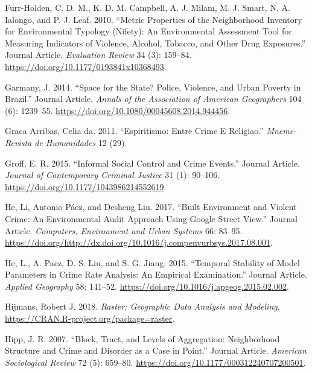 \documentclass[smallextended]{svjour3}       %
\begin{document}
\leavevmode\hypertarget{ref-Furr2010metric}{}%
Furr-Holden, C. D. M., K. D. M. Campbell, A. J. Milam, M. J. Smart, N.
A. Ialongo, and P. J. Leaf. 2010. ``Metric Properties of the
Neighborhood Inventory for Environmental Typology (Nifety): An
Environmental Assessment Tool for Measuring Indicators of Violence,
Alcohol, Tobacco, and Other Drug Exposures.'' Journal Article.
\emph{Evaluation Review} 34 (3): 159--84.
\url{https://doi.org/10.1177/0193841x10368493}.

\leavevmode\hypertarget{ref-Garmany2014space}{}%
Garmany, J. 2014. ``Space for the State? Police, Violence, and Urban
Poverty in Brazil.'' Journal Article. \emph{Annals of the Association of
American Geographers} 104 (6): 1239--55.
\url{https://doi.org/10.1080/00045608.2014.944456}.

\leavevmode\hypertarget{ref-daGraca2011espiritismo}{}%
Graca Arribas, Celia da. 2011. ``Espiritismo: Entre Crime E Religiao.''
\emph{Mneme-Revista de Humanidades} 12 (29).

\leavevmode\hypertarget{ref-Groff2015informal}{}%
Groff, E. R. 2015. ``Informal Social Control and Crime Events.'' Journal
Article. \emph{Journal of Contemporary Criminal Justice} 31 (1):
90--106. \url{https://doi.org/10.1177/1043986214552619}.

\leavevmode\hypertarget{ref-He2017built}{}%
He, Li, Antonio Páez, and Desheng Liu. 2017. ``Built Environment and
Violent Crime: An Environmental Audit Approach Using Google Street
View.'' Journal Article. \emph{Computers, Environment and Urban Systems}
66: 83--95.
\url{https://doi.org/http://dx.doi.org/10.1016/j.compenvurbsys.2017.08.001}.

\leavevmode\hypertarget{ref-He2015temporal}{}%
He, L., A. Paez, D. S. Liu, and S. G. Jiang. 2015. ``Temporal Stability
of Model Parameters in Crime Rate Analysis: An Empirical Examination.''
Journal Article. \emph{Applied Geography} 58: 141--52.
\url{https://doi.org/10.1016/j.apgeog.2015.02.002}.

\leavevmode\hypertarget{ref-Hijmans2018raster}{}%
Hijmans, Robert J. 2018. \emph{Raster: Geographic Data Analysis and
Modeling}. \url{https://CRAN.R-project.org/package=raster}.

\leavevmode\hypertarget{ref-Hipp2007block}{}%
Hipp, J. R. 2007. ``Block, Tract, and Levels of Aggregation:
Neighborhood Structure and Crime and Disorder as a Case in Point.''
Journal Article. \emph{American Sociological Review} 72 (5): 659--80.
\url{https://doi.org/10.1177/000312240707200501}.
\end{document}

